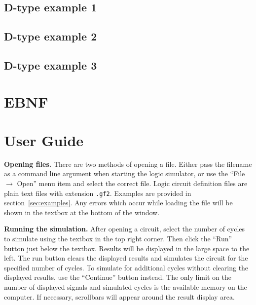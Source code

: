 \documentclass[a4paper,10pt]{article}
\begin{document}
\subsection{D-type example 1}
\label{sec:example-dtype-order}


\subsection{D-type example 2}
\label{sec:example-dtype-randdet}


\subsection{D-type example 3}
\label{sec:example-dtype-final}


\section{EBNF}
\label{sec:EBNF}


\clearpage
\section{User Guide}
\label{sec:guide}
\textbf{Opening files.} There are two methods of opening a file. Either pass the filename as a command line argument when starting the logic simulator, or use the ``File $\rightarrow$ Open'' menu item and select the correct file. Logic circuit definition files are plain text files with extension \texttt{.gf2}. Examples are provided in section~\ref{sec:examples}. Any errors which occur while loading the file will be shown in the textbox at the bottom of the window.

\textbf{Running the simulation.} After opening a circuit, select the number of cycles to simulate using the textbox in the top right corner. Then click the ``Run'' button just below the textbox. Results will be displayed in the large space to the left. The run button clears the displayed results and simulates the circuit for the specified number of cycles. To simulate for additional cycles without clearing the displayed results, use the ``Continue'' button instead. The only limit on the number of displayed signals and simulated cycles is the available memory on the computer.  If necessary, scrollbars will appear around the result display area. 
\end{document}
